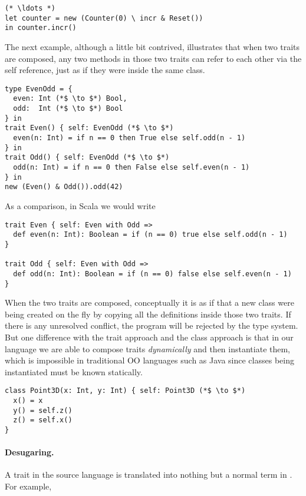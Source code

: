 \begin{lstlisting}
(* \ldots *)
let counter = new (Counter(0) \ incr & Reset())
in counter.incr()
\end{lstlisting}

The next example, although a little bit contrived, illustrates that when two
traits are composed, any two methods in those two traits can refer to each
other via the self reference, just as if they were inside the same class.

\begin{lstlisting}
type EvenOdd = {
  even: Int (*$ \to $*) Bool,
  odd:  Int (*$ \to $*) Bool
} in
trait Even() { self: EvenOdd (*$ \to $*)
  even(n: Int) = if n == 0 then True else self.odd(n - 1)
} in
trait Odd() { self: EvenOdd (*$ \to $*)
  odd(n: Int) = if n == 0 then False else self.even(n - 1)
} in
new (Even() & Odd()).odd(42)
\end{lstlisting}

As a comparison, in Scala we would write

\begin{lstlisting}
trait Even { self: Even with Odd =>
  def even(n: Int): Boolean = if (n == 0) true else self.odd(n - 1)
}

trait Odd { self: Even with Odd =>
  def odd(n: Int): Boolean = if (n == 0) false else self.even(n - 1)
}
\end{lstlisting}

When the two traits are composed, conceptually it is as if that a new class were
being created on the fly by copying all the definitions inside those two traits.
If there is any unresolved conflict, the program will be rejected by the type
system. But one difference with the trait approach and the class approach is
that in our language we are able to compose traits \emph{dynamically} and then
instantiate them, which is impossible in traditional OO languages such as Java
since classes being instantiated must be known statically.

\begin{lstlisting}
class Point3D(x: Int, y: Int) { self: Point3D (*$ \to $*)
  x() = x
  y() = self.z()
  z() = self.x()
}
\end{lstlisting}

\paragraph{Desugaring.} A trait in the source language is translated into
nothing but a normal term in \name. For example,

